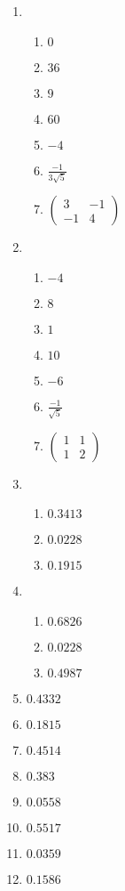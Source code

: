 \documentclass[12pt]{article}
\begin{document}
\begin{enumerate}
\item  
\begin{enumerate}
\item   $0 $  
\item   $36$   
\item  $9 $  
\item   $60 $  
\item  $-4$   
\item   $\frac{-1}{3\sqrt{5}}$   
\item  $\begin{pmatrix}
 3 & -1 \\ 
-1 & 4
\end{pmatrix}$   
\end{enumerate}

\item   
\begin{enumerate}
\item $-4$   
\item $8 $  
\item $1 $  
\item $10 $  
\item $-6$   
\item$ \frac{-1}{\sqrt{5}}$   

\item $\begin{pmatrix}
 1 & 1 \\ 
 1 & 2
\end{pmatrix}$   
\end{enumerate}
\item    
\begin{enumerate}
\item $0.3413$   
\item $0.0228$   
\item $0.1915$ 
\end{enumerate}

\item    
\begin{enumerate}
\item $0.6826$   
\item $0.0228  $ 
\item $0.4987  $ 
\end{enumerate}

\item $0.4332 $  
\item $0.1815  $ 
\item $0.4514 $ 
\item $0.383  $ 
\item $0.0558 $   
\item $0.5517$  
\item $0.0359 $ 
\item $0.1586$  


\end{enumerate}
\end{document}
